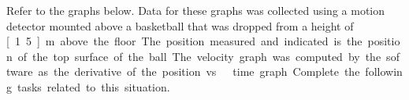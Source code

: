 \label{fnt8.2.1-6}

\def\FunctionFa(#1){-5.2*(#1)^2+1.5} %
\def\FunctionFb(#1){40*((#1)-.55)^2+.1} %
\def\FunctionFc(#1){-4.4*((#1)-1.1)^2+1.3} %

\def\FunctionGa(#1){-10*(#1)} %
\def\FunctionGb(#1){-9*(#1)+9.9} %
\def\FunctionGc(#1){190*(#1)-104.7} %
\def\FunctionGd(#1){3200*((#1)-.51)^2-5.1} %
\def\FunctionGe(#1){-3000*((#1)-.59)^2+4.6} %

\noindent Refer to the graphs below. Data for these graphs was collected using a motion detector mounted above a basketball that was dropped from a height of \unit[1.5]{m} above the floor. The position measured and indicated is the position of the top surface of the ball. The velocity graph was computed by the software as the derivative of the position vs.\ time graph. Complete the following tasks related to this situation.

